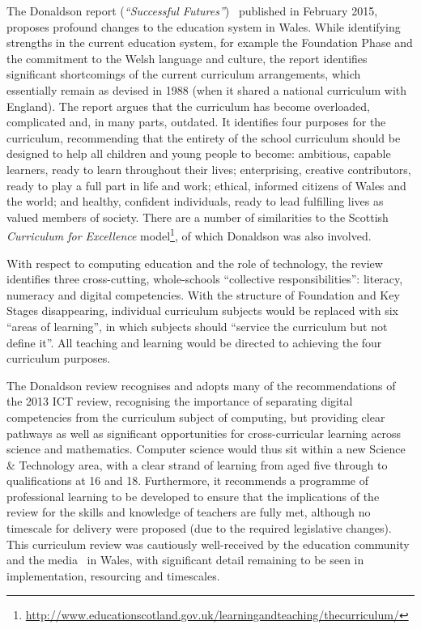 \documentclass{sig-alternate}
\begin{document}
The Donaldson report (\emph{``Successful
Futures''})~\cite{Donaldson:2015} published in February 2015, proposes
profound changes to the education system in Wales. While identifying
strengths in the current education system, for example the Foundation
Phase and the commitment to the Welsh language and culture, the report
identifies significant shortcomings of the current curriculum
arrangements, which essentially remain as devised in 1988 (when it
shared a national curriculum with England). The report argues that the
curriculum has become overloaded, complicated and, in many parts,
outdated. It identifies four purposes for the curriculum, recommending
that the entirety of the school curriculum should be designed to help
all children and young people to become: ambitious, capable learners,
ready to learn throughout their lives; enterprising, creative
contributors, ready to play a full part in life and work; ethical,
informed citizens of Wales and the world; and healthy, confident
individuals, ready to lead fulfilling lives as valued members of
society. There are a number of similarities to the Scottish
{\emph{Curriculum for Excellence}}
model\footnote{\url{http://www.educationscotland.gov.uk/learningandteaching/thecurriculum/}},
of which Donaldson was also involved.

With respect to computing education and
the role of technology, the review identifies three cross-cutting,
whole-schools ``collective
responsibilities'': literacy, numeracy and digital competencies. With
the structure of Foundation and Key Stages disappearing, individual
curriculum subjects would be replaced with six ``areas of learning'',
in which subjects should ``service the curriculum but not define
it''. All teaching and learning would be directed to achieving the
four curriculum purposes.

The Donaldson review recognises and adopts many of the
recommendations of the 2013 ICT review, recognising the importance
of separating digital competencies from the curriculum subject of
computing, but providing clear pathways as well as significant
opportunities for cross-curricular learning across science and
mathematics. Computer science would thus sit within a new Science \&
Technology area, with a clear strand of learning from aged five
through to qualifications at 16 and 18. Furthermore, it recommends
a programme of professional learning to be developed to ensure that the
implications of the review for the skills and knowledge of teachers
are fully met, although no timescale for delivery were proposed (due
to the required legislative changes). This curriculum review was
cautiously well-received by the education community and the
media~\cite{bbcnewsdonaldson:2015} in Wales, with significant detail
remaining to be seen in implementation, resourcing and timescales.
\end{document}
